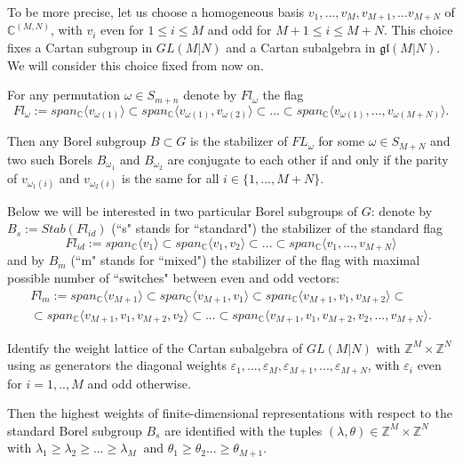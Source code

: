 \documentclass[12pt]{amsart}
\numberwithin{equation}{section}
\numberwithin{equation}{section}
\theoremstyle{definition}
\begin{document}
To be more precise, let us choose a homogeneous basis $v_1,...,v_M,v_{M+1},...v_{M+N}$ of $\mathbb{C}^{(M,N)}$, with $v_i$ even for $1\le i \le M$ and odd for $M+1 \le i \le M+N$. This choice fixes a Cartan subgroup in $GL(M|N)$ and a Cartan subalgebra in $\mathfrak{gl}(M|N)$. We will consider this choice fixed from now on.

For any permutation $\omega \in S_{m+n}$ denote by $Fl_\omega$ the flag
\begin{equation}
    Fl_\omega := span_\mathbb{C}\langle v_{\omega(1)}\rangle \subset span_\mathbb{C}\langle v_{\omega(1)},v_{\omega(2)}\rangle \subset ...\subset span_\mathbb{C}\langle v_{\omega(1)},...,v_{\omega(M+N)}\rangle.
\end{equation}

Then any Borel subgroup $B \subset G$ is the stabilizer of $FL_\omega$ for some $\omega \in S_{M+N}$ and two such Borels $B_{\omega_1}$ and $B_{\omega_2}$ are conjugate to each other if and only if the parity of $v_{\omega_1(i)}$ and $v_{\omega_2(i)}$ is the same for all $i \in \{1,...,M+N\}$.

Below we will be interested in two particular Borel subgroups of $G$: denote by $B_{s}:=Stab(Fl_{id})$  (``s" stands for ``standard") the stabilizer of the standard flag 
\begin{equation}
    Fl_{id}:= span_\mathbb{C}\langle v_1\rangle \subset span_\mathbb{C}\langle v_{1},v_{2}\rangle \subset ...\subset span_\mathbb{C}\langle v_{1},...,v_{M+N}\rangle
\end{equation}
and by $B_{m}$ (``m" stands for ``mixed") the stabilizer of the flag with maximal possible number of ``switches" between even and odd vectors:
\begin{multline*}
    Fl_{m}:= span_\mathbb{C}\langle v_{M+1}\rangle \subset span_\mathbb{C}\langle v_{M+1}, v_{1}\rangle \subset span_\mathbb{C}\langle v_{M+1},v_{1},v_{M+2}\rangle\subset \\
    \subset span_\mathbb{C}\langle v_{M+1},v_{1},v_{M+2}, v_{2}\rangle\subset...\subset span_\mathbb{C}\langle v_{M+1},v_{1},v_{M+2}, v_{2},...,v_{M+N}\rangle.
\end{multline*}


Identify the weight lattice of the Cartan subalgebra of $GL(M|N)$ with $\mathbb{Z}^M \times \mathbb{Z}^N$ using as generators the diagonal weights $\varepsilon_1, ..., \varepsilon_M,\varepsilon_{M+1},..., \varepsilon_{M+N}$, with $\varepsilon_i$ even for $i=1,..,M$ and odd otherwise.

Then the highest weights of finite-dimensional representations with respect to the standard Borel subgroup $B_s$ are identified with the tuples $(\lambda,\theta)\in\mathbb{Z}^M\times\mathbb{Z}^{N}$ with $\lambda_1 \ge \lambda_2 \ge ... \ge \lambda_M\ \text{ and }\theta_1\ge \theta_2 ... \ge \theta_{M+1}$.
\end{document}
